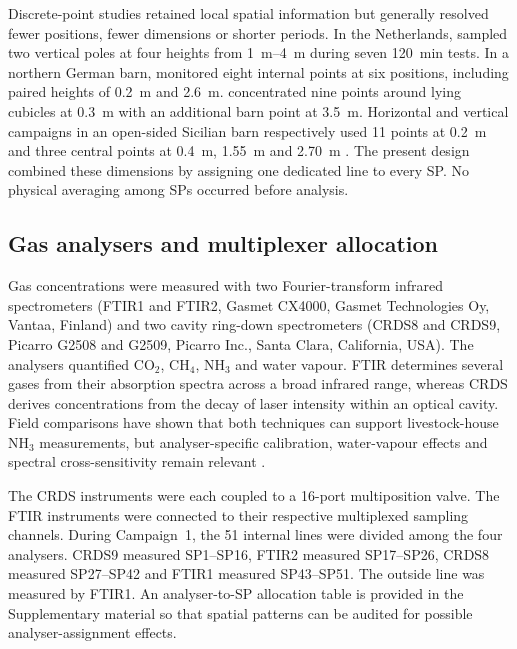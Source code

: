 \documentclass[12pt,a4paper]{article}
\begin{document}
Discrete-point studies retained local spatial information but generally resolved fewer positions, fewer dimensions or shorter periods. In the Netherlands, \citet{Mendes2015} sampled two vertical poles at four heights from \SIrange{1}{4}{m} during seven \SI{120}{min} tests. In a northern German barn, \citet{Fiedler2014} monitored eight internal points at six positions, including paired heights of \SI{0.2}{m} and \SI{2.6}{m}. \citet{Wu2016} concentrated nine points around lying cubicles at \SI{0.3}{m} with an additional barn point at \SI{3.5}{m}. Horizontal and vertical campaigns in an open-sided Sicilian barn respectively used 11 points at \SI{0.2}{m} and three central points at \SI{0.4}{m}, \SI{1.55}{m} and \SI{2.70}{m} \citep{Durso2022,Durso2024}. The present design combined these dimensions by assigning one dedicated line to every SP. No physical averaging among SPs occurred before analysis.


\subsection{Gas analysers and multiplexer allocation}

Gas concentrations were measured with two Fourier-transform infrared spectrometers (FTIR1 and FTIR2, Gasmet CX4000, Gasmet Technologies Oy, Vantaa, Finland) and two cavity ring-down spectrometers (CRDS8 and CRDS9, Picarro G2508 and G2509, Picarro Inc., Santa Clara, California, USA). The analysers quantified \(\mathrm{CO_2}\), \(\mathrm{CH_4}\), \(\mathrm{NH_3}\) and water vapour. FTIR determines several gases from their absorption spectra across a broad infrared range, whereas CRDS derives concentrations from the decay of laser intensity within an optical cavity. Field comparisons have shown that both techniques can support livestock-house \(\mathrm{NH_3}\) measurements, but analyser-specific calibration, water-vapour effects and spectral cross-sensitivity remain relevant \citep{Kamp2019,Zhuang2020}.

The CRDS instruments were each coupled to a 16-port multiposition valve. The FTIR instruments were connected to their respective multiplexed sampling channels. During Campaign~1, the 51 internal lines were divided among the four analysers. CRDS9 measured SP1--SP16, FTIR2 measured SP17--SP26, CRDS8 measured SP27--SP42 and FTIR1 measured SP43--SP51. The outside line was measured by FTIR1. An analyser-to-SP allocation table is provided in the Supplementary material so that spatial patterns can be audited for possible analyser-assignment effects.
\end{document}

